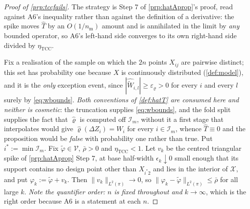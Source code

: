 
\begin{proof}[Proof of \cref{prp:tccfails}]
The strategy is Step 7 of \cref{prp:hatAprop}'s proof, read against A6's inequality rather than against
the definition of a derivative: the spike moves $\hat T$ by an $O(1/n_{\mathrm m})$ amount and is
annihilated in the limit by \emph{any} bounded operator, so A6's left-hand side converges to its own
right-hand side divided by $\eta_{\mathrm{TCC}}$.

Fix a realisation of the sample on which the $2n$ points $X_{ij}$ are pairwise distinct; this set has
probability one because $X$ is continuously distributed (\cref{def:model}), and it is the \emph{only}
exception event, since $|\widehat{\widetilde W}_{i,l}|\ge\varepsilon_\varrho>0$ for every $i$ and every
$l$ surely by \eqref{eq:wbounds}. \emph{Both conventions of \cref{def:hatT} are consumed here and neither is
cosmetic}: the truncation supplies \eqref{eq:wbounds}, and the fold split supplies the fact that
$\hat\varrho$ is computed off $\mathcal I_m$, without it a first stage that interpolates would give
$\hat\varrho(\Delta Z_i)=W_i$ for every $i\in\mathcal I_m$, whence $\hat T\equiv0$ and the proposition
would be \emph{false} with probability one rather than true. Put $i^\ast:=\min\mathcal I_m$. Fix
$\tilde\varphi\in\mathcal V$, $\bar\rho>0$ and $\eta_{\mathrm{TCC}}<1$. Let $v_k$ be the
centred triangular spike of \cref{prp:hatAprop} Step 7, at base half-width $\epsilon_k\downarrow0$
small enough that its support contains no design point other than $X_{i^\ast2}$ and lies in the
interior of $\mathcal X$, and put $\varphi_k:=\tilde\varphi+v_k$. Then
$\|v_k\|_{L^{2}(\pi)}\to0$, so $\|\varphi_k-\tilde\varphi\|_{L^{2}(\pi)}\le\bar\rho$ for all large $k$.
\emph{Note the quantifier order: $n$ is fixed throughout and $k\to\infty$}, which is the right order
because A6 is a statement at each $n$.


\end{proof}
